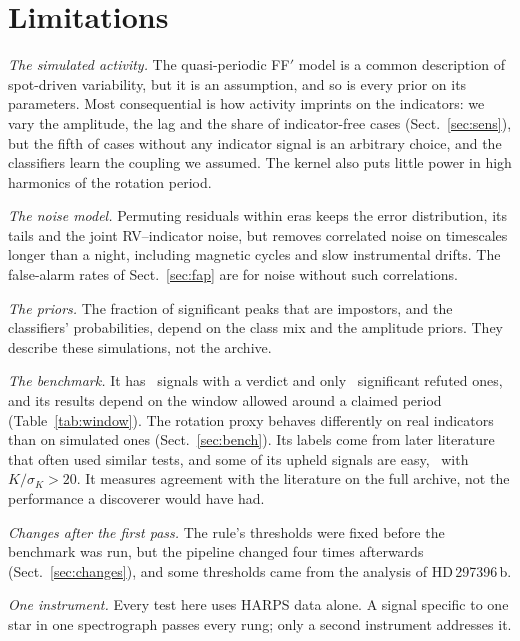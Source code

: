 \section{Limitations}
\label{sec:limits}

\emph{The simulated activity.} The quasi-periodic FF$'$ model is a common description of
spot-driven variability, but it is an assumption, and so is every prior on its
parameters. Most consequential is how activity imprints on the indicators: we vary the
amplitude, the lag and the share of indicator-free cases (Sect.~\ref{sec:sens}), but the
fifth of cases without any indicator signal is an arbitrary choice, and the classifiers
learn the coupling we assumed. The kernel also puts little power in high harmonics of
the rotation period.

\emph{The noise model.} Permuting residuals within eras keeps the error distribution,
its tails and the joint RV--indicator noise, but removes correlated noise on timescales
longer than a night, including magnetic cycles and slow instrumental drifts. The
false-alarm rates of Sect.~\ref{sec:fap} are for noise without such correlations.

\emph{The priors.} The fraction of significant peaks that are impostors, and the
classifiers' probabilities, depend on the class mix and the amplitude priors. They
describe these simulations, not the archive.

\emph{The benchmark.} It has \nmBenchBinary\ signals with a verdict and only
\nmBRuleRefN\ significant refuted ones, and its results depend on the window allowed
around a claimed period (Table~\ref{tab:window}). The rotation proxy behaves differently
on real indicators than on simulated ones (Sect.~\ref{sec:bench}). Its labels come from later literature that often
used similar tests, and some of its upheld signals are easy, \nmBEasyN\ with
$K/\sigma_K > 20$. It measures agreement with the literature on the full archive, not the
performance a discoverer would have had.

\emph{Changes after the first pass.} The rule's thresholds were fixed before the
benchmark was run, but the pipeline changed four times afterwards
(Sect.~\ref{sec:changes}), and some thresholds came from the analysis of HD\,297396\,b.

\emph{One instrument.} Every test here uses HARPS data alone. A signal specific to one
star in one spectrograph passes every rung; only a second instrument addresses it.

